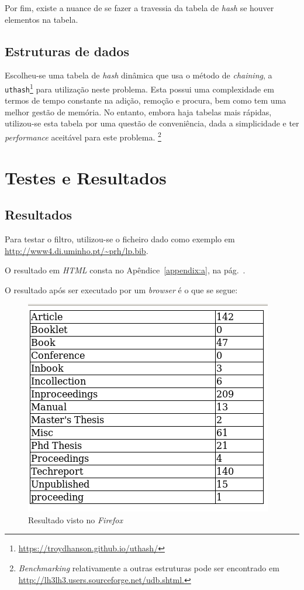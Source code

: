 Por fim, existe a nuance de se fazer a travessia da
tabela de \emph{hash} se houver elementos na tabela.


\subsection{Estruturas de dados}
\label{sec:subsec:es:a}
Escolheu-se uma tabela de \emph{hash} dinâmica que usa o método de
\emph{chaining},
a \texttt{uthash}\footnote{\url{https://troydhanson.github.io/uthash/}} para
utilização neste problema.  Esta possui uma complexidade em termos de tempo
constante na adição, remoção e procura, bem como tem uma melhor gestão de
memória. No entanto, embora haja tabelas mais rápidas, utilizou-se esta tabela
por uma questão de conveniência, dada a simplicidade e ter \emph{performance}
aceitável para este problema.  \footnote{\emph{Benchmarking} relativamente
a outras estruturas pode ser encontrado em
\url{http://lh3lh3.users.sourceforge.net/udb.shtml.}}


\section{Testes e Resultados}
\label{sec:ts:a}


\subsection{Resultados}
Para testar o filtro, utilizou-se o ficheiro  dado como exemplo
em \url{http://www4.di.uminho.pt/~prh/lp.bib}.

O resultado em \emph{HTML} consta no Apêndice~\ref{appendix:a}, na
pág.~\pageref{appendix:a}.

O resultado após ser executado por um \emph{browser} é o que se segue:

\begin{figure}[h!]
	\centering
	\includegraphics[scale=0.5]{./testes/res_html}
	\caption{Resultado visto no \emph{Firefox}}
	\label{fig:res1}
\end{figure}


